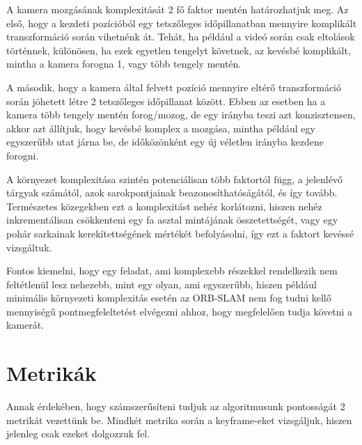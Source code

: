 A kamera mozgásának komplexitását 2 fő faktor mentén határozhatjuk meg.
Az első, hogy a kezdeti pozícióból egy tetszőleges időpillanatban mennyire komplikált transzformáció során vihetnénk át.
Tehát, ha például a videó során csak eltolások történnek, különösen, ha ezek egyetlen tengelyt követnek, az kevésbé komplikált, mintha a kamera forogna 1, vagy több tengely mentén.

A második, hogy a kamera által felvett pozíció mennyire eltérő transzformáció során jöhetett létre 2 tetszőleges időpillanat között.
Ebben az esetben ha a kamera több tengely mentén forog/mozog, de egy irányba teszi azt konzisztensen, akkor azt állítjuk, hogy kevésbé komplex a mozgása, mintha például egy egyszerűbb utat járna be, de időközönként egy új véletlen irányba kezdene forogni.

A környezet komplexitása szintén potenciálisan több faktortól függ, a jelenlévő tárgyak számától, azok sarokpontjainak beazonosíthatóságától, és így tovább.
Természetes közegekben ezt a komplexitást nehéz korlátozni, hiszen nehéz inkrementálisan csökkenteni egy fa asztal mintájának összetettségét, vagy egy pohár sarkainak kerekítettségének mértékét befolyásolni, így ezt a faktort kevéssé vizsgáltuk.

Fontos kiemelni, hogy egy feladat, ami komplexebb részekkel rendelkezik nem feltétlenül lesz nehezebb, mint egy olyan, ami egyszerűbb, hiszen például minimális környezeti komplexitás esetén az ORB-SLAM nem fog tudni kellő mennyiségű pontmegfeleltetést elvégezni ahhoz, hogy megfelelően tudja követni a kamerát.

\section{Metrikák}

Annak érdekében, hogy számszerűsíteni tudjuk az algoritmusunk pontosságát 2 metrikát vezettünk be.
Mindkét metrika során a keyframe-eket vizsgáljuk, hiszen jelenleg csak ezeket dolgozzuk fel.

